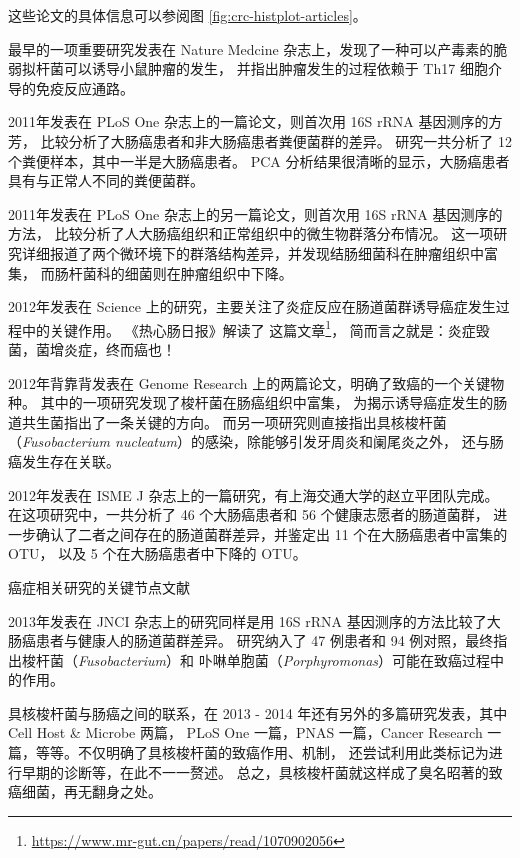 \documentclass[]{ctexbook}
\renewcommand{\href}[2]{#2\footnote{\url{#1}}}
\begin{document}
这些论文的具体信息可以参阅图 \ref{fig:crc-histplot-articles}。

最早的一项重要研究发表在 Nature Medcine 杂志上，发现了一种可以产毒素的脆弱拟杆菌可以诱导小鼠肿瘤的发生，
并指出肿瘤发生的过程依赖于 Th17 细胞介导的免疫反应通路\citep{wuHumanColonicCommensal2009}。

2011年发表在 PLoS One 杂志上的一篇论文，则首次用 16S rRNA 基因测序的方芳，
比较分析了大肠癌患者和非大肠癌患者粪便菌群的差异\citep{sobhaniMicrobialDysbiosisColorectal2011}。
研究一共分析了 12 个粪便样本，其中一半是大肠癌患者。
PCA 分析结果很清晰的显示，大肠癌患者具有与正常人不同的粪便菌群。

2011年发表在 PLoS One 杂志上的另一篇论文，则首次用 16S rRNA 基因测序的方法，
比较分析了人大肠癌组织和正常组织中的微生物群落分布情况\citep{marchesiHumanColorectalCancer2011}。
这一项研究详细报道了两个微环境下的群落结构差异，并发现结肠细菌科在肿瘤组织中富集，
而肠杆菌科的细菌则在肿瘤组织中下降。

2012年发表在 Science 上的研究，主要关注了炎症反应在肠道菌群诱导癌症发生过程中的关键作用。
《热心肠日报》解读了 \href{https://www.mr-gut.cn/papers/read/1070902056}{这篇文章}，
简而言之就是：炎症毁菌，菌增炎症，终而癌也！

2012年背靠背发表在 Genome Research 上的两篇论文，明确了致癌的一个关键物种。
其中的一项研究发现了梭杆菌在肠癌组织中富集，
为揭示诱导癌症发生的肠道共生菌指出了一条关键的方向\citep{kosticGenomicAnalysisIdentifies2012}。
而另一项研究则直接指出具核梭杆菌（\emph{Fusobacterium nucleatum}）的感染，除能够引发牙周炎和阑尾炎之外，
还与肠癌发生存在关联\citep{castellarinFusobacteriumNucleatumInfection2012}。

2012年发表在 ISME J 杂志上的一篇研究，有上海交通大学的赵立平团队完成\citep{wangStructuralSegregationGut2012a}。
在这项研究中，一共分析了 46 个大肠癌患者和 56 个健康志愿者的肠道菌群，
进一步确认了二者之间存在的肠道菌群差异，并鉴定出 11 个在大肠癌患者中富集的 OTU，
以及 5 个在大肠癌患者中下降的 OTU。

\hypertarget{htmlwidget-0f96200b80f25da8ac6b}{}

\label{fig:crc-histplot-articles}癌症相关研究的关键节点文献

2013年发表在 JNCI 杂志上的研究同样是用 16S rRNA 基因测序的方法比较了大肠癌患者与健康人的肠道菌群差异。
研究纳入了 47 例患者和 94 例对照，最终指出梭杆菌（\emph{Fusobacterium}）和
卟啉单胞菌（\emph{Porphyromonas}）可能在致癌过程中的作用\citep{ahnHumanGutMicrobiome2013}。

具核梭杆菌与肠癌之间的联系，在 2013 - 2014 年还有另外的多篇研究发表，其中 Cell Host \& Microbe 两篇，
PLoS One 一篇，PNAS 一篇，Cancer Research 一篇，等等。不仅明确了具核梭杆菌的致癌作用、机制，
还尝试利用此类标记为进行早期的诊断等，在此不一一赘述。
总之，具核梭杆菌就这样成了臭名昭著的致癌细菌，再无翻身之处。
\end{document}
